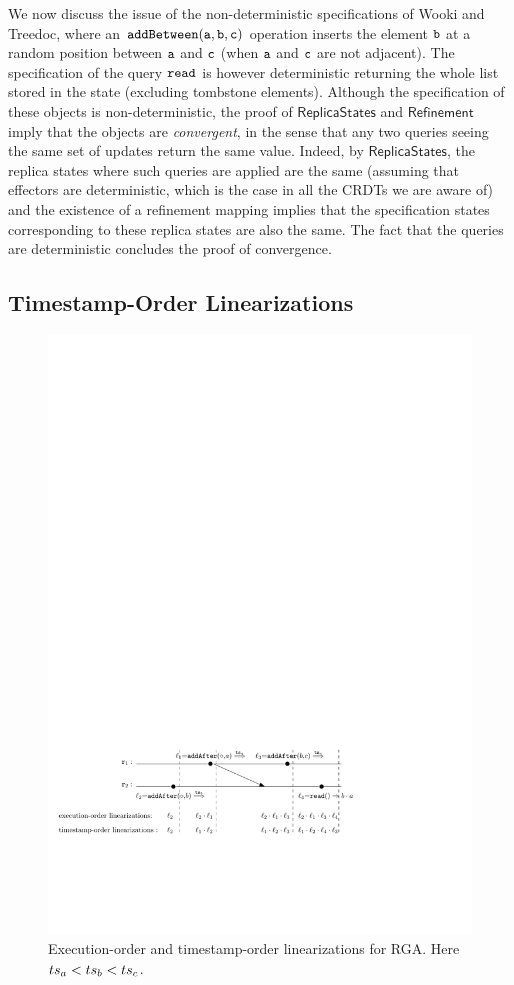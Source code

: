 We now discuss the issue of the non-deterministic specifications of Wooki and Treedoc, where an ${\tt addBetween(a,b,c)}$ operation inserts the element ${\tt b}$ at a random position between ${\tt a}$ and ${\tt c}$ (when ${\tt a}$ and ${\tt c}$ are not adjacent). The specification of the query ${\tt read}$ is however deterministic returning the whole list stored in the state (excluding tombstone elements). Although the specification of these objects is non-deterministic, the proof of $\mathsf{ReplicaStates}$ and $\mathsf{Refinement}$ imply that the objects are \emph{convergent}, in the sense that any two queries seeing the same set of updates return the same value. Indeed, by $\mathsf{ReplicaStates}$, the replica states where such queries are applied are the same (assuming that effectors are deterministic, which is the case in all the CRDTs we are aware of) and the existence of a refinement mapping implies that the specification states corresponding to these replica states are also the same. The fact that the queries are deterministic concludes the proof of convergence.

\subsection{Timestamp-Order Linearizations}
\label{subsec:time-stamp order as linearizabtion}

\begin{figure}[t]
  \centering
  \includegraphics[width=0.7 \textwidth]{figures/RGAHisandLin.pdf}
\vspace{-1mm}
  \caption{Execution-order and timestamp-order linearizations for RGA. Here $ts_a<ts_b<ts_c$.}
  \label{fig:a history of RGA and its RA-linearization}
  \vspace{-3mm}
\end{figure}

